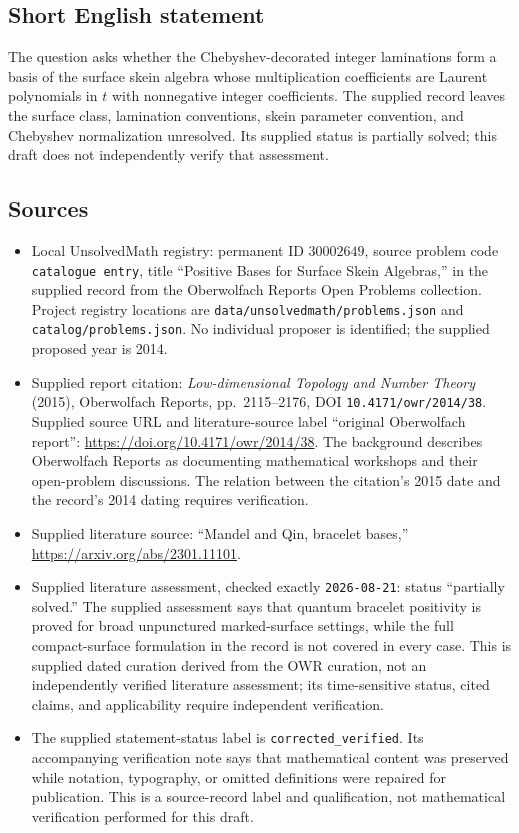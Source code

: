 \documentclass[11pt]{article}
\begin{document}
\subsection{Short English statement}
The question asks whether the Chebyshev-decorated integer laminations form a basis of the surface skein algebra whose multiplication coefficients are Laurent polynomials in \(t\) with nonnegative integer coefficients. The supplied record leaves the surface class, lamination conventions, skein parameter convention, and Chebyshev normalization unresolved. Its supplied status is partially solved; this draft does not independently verify that assessment.
\subsection{Sources}
\begin{itemize}
\item Local UnsolvedMath registry: permanent ID \(30002649\), source problem code \texttt{catalogue entry}, title ``Positive Bases for Surface Skein Algebras,'' in the supplied record from the Oberwolfach Reports Open Problems collection. Project registry locations are \texttt{data/unsolvedmath/problems.json} and \texttt{catalog/problems.json}. No individual proposer is identified; the supplied proposed year is 2014.
\item Supplied report citation: \emph{Low-dimensional Topology and Number Theory} (2015), Oberwolfach Reports, pp.\ 2115--2176, DOI \texttt{10.4171/owr/2014/38}. Supplied source URL and literature-source label ``original Oberwolfach report'': \url{https://doi.org/10.4171/owr/2014/38}. The background describes Oberwolfach Reports as documenting mathematical workshops and their open-problem discussions. The relation between the citation's 2015 date and the record's 2014 dating requires verification.
\item Supplied literature source: ``Mandel and Qin, bracelet bases,'' \url{https://arxiv.org/abs/2301.11101}.
\item Supplied literature assessment, checked exactly \texttt{2026-08-21}: status ``partially solved.'' The supplied assessment says that quantum bracelet positivity is proved for broad unpunctured marked-surface settings, while the full compact-surface formulation in the record is not covered in every case. This is supplied dated curation derived from the OWR curation, not an independently verified literature assessment; its time-sensitive status, cited claims, and applicability require independent verification.
\item The supplied statement-status label is \texttt{corrected\_verified}. Its accompanying verification note says that mathematical content was preserved while notation, typography, or omitted definitions were repaired for publication. This is a source-record label and qualification, not mathematical verification performed for this draft.
\end{itemize}
\end{document}
